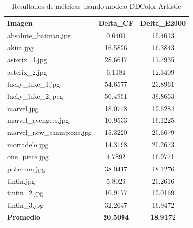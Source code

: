 \documentclass[a4paper]{article}
\begin{document}
\begin{table}[ht]
	\centering
	\begin{tabular}{lcc}
		\hline
		\textbf{Imagen} & \textbf{Delta\_CF} & \textbf{Delta\_E2000} \\
		\hline
		absolute\_batman.jpg      & 0.6400  & 19.4613 \\
		akira.jpg                 & 16.5826 & 16.3843 \\
		asterix\_1.jpg            & 28.6617 & 17.7935 \\
		asterix\_2.jpg            & 6.1184  & 12.3409 \\
		lucky\_luke\_1.jpg        & 54.6577 & 23.8961 \\
		lucky\_luke\_2.jpeg       & 50.4951 & 39.8653 \\
		marvel.jpg                & 18.0748 & 12.6284 \\
		marvel\_avengers.jpg      & 10.9533 & 16.1225 \\
		marvel\_new\_champions.jpg & 15.3220 & 20.6679 \\
		mortadelo.jpg             & 14.3198 & 20.2673 \\
		one\_piece.jpg            & 4.7892  & 16.9771 \\
		pokemon.jpg               & 38.0417 & 18.1276 \\
		tintin.jpg                & 5.8026  & 20.2616 \\
		tintin\_2.jpg             & 10.9177 & 12.0169 \\
		tintin\_3.jpg             & 32.2647 & 16.9472 \\
		\hline
		\textbf{Promedio} & \textbf{20.5094} & \textbf{18.9172} \\
		\hline
	\end{tabular}
	\caption{Resultados de métricas usando modelo DDColor Artistic}
	\label{tab:resultados_artistic}
\end{table}
\end{document}
